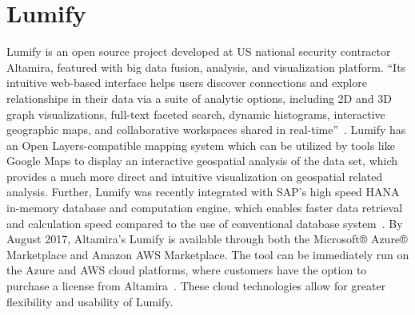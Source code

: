 \section{Lumify}
Lumify is an open source project developed at US national security contractor Altamira, featured with 
big data fusion, analysis, and visualization platform. ``Its intuitive web-based interface helps users 
discover connections and explore relationships in their data via a suite of analytic options, including 2D 
and 3D graph visualizations, full-text faceted search, dynamic histograms, interactive geographic 
maps, and collaborative workspaces shared in real-time''~\cite{hid-sp18-405-www-lumify}. Lumify has 
an Open Layers-compatible mapping system which can be utilized by tools like Google Maps to display 
an interactive geospatial analysis of the data set, which provides a much more direct and intuitive 
visualization on geospatial related analysis. Further, Lumify was recently integrated with SAP's high 
speed HANA in-memory database and computation engine, which enables faster data retrieval and 
calculation speed compared to the use of conventional database 
system~\cite{hid-sp18-405-linkedinblog-lumify}. By August 2017, Altamira’s Lumify is available through 
both the Microsoft® Azure® Marketplace and Amazon AWS Marketplace. The tool can be immediately 
run on the Azure and AWS cloud platforms, where customers have the option to purchase a license 
from Altamira~\cite{hid-sp18-405-wwwaws-lumify}\cite{hid-sp18-405-wwwazure-lumify}. These cloud 
technologies allow for greater flexibility and usability of Lumify. 
